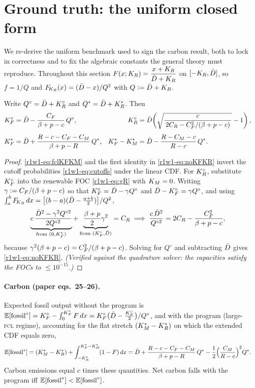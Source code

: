 \section{Ground truth: the uniform closed form}\label{r1w1-sec:uniform}

We re-derive the uniform benchmark used to sign the carbon result, both to lock
in correctness and to fix the algebraic constants the general theory must
reproduce. Throughout this section $F(x;K_R)=\dfrac{x+K_R}{\bar D+K_R}$ on
$[-K_R,\bar D]$, so $f=1/Q$ and $F_{\!K_R}(x)=(\bar D-x)/Q^2$ with $Q\vcentcolon=\bar D+K_R$.

\begin{lemma}\label{r1w1-lem:uniform}
Write $Q^{\circ}=\bar D+K_R^{\circ}$ and $Q^{*}=\bar D+K_R^{*}$. Then
\begin{align}
  K_F^{\circ}&=\bar D-\frac{C_F}{\beta+p-c}\,Q^{\circ},
  &K_R^{\circ}&=\bar D\!\left(\sqrt{\dfrac{c}{\,2C_R-C_F^{2}/(\beta+p-c)\,}}-1\right),
  \label{r1w1-eq:noKFKR}\\[4pt]
  K_F^{*}&=\bar D+\frac{R-c-C_F-C_M}{\beta+p-R}\,Q^{*},
  &K_F^{*}-K_M^{*}&=\bar D-\frac{R-C_M-c}{R-c}\,Q^{*}.
  \label{r1w1-eq:fclKFKM}
\end{align}
\end{lemma}

\begin{proof}
\eqref{r1w1-eq:fclKFKM} and the first identity in \eqref{r1w1-eq:noKFKR} invert the cutoff
probabilities \eqref{r1w1-eq:cutoffs} under the linear CDF. For $K_R^{\circ}$, substitute
$K_F^{\circ}$ into the renewable FOC \eqref{r1w1-eq:gR} with $K_M=0$. Writing
$\gamma\vcentcolon=C_F/(\beta+p-c)$ so that $K_F^{\circ}=\bar D-\gamma Q^{\circ}$ and
$\bar D-K_F^{\circ}=\gamma Q^{\circ}$, and using
$\int_a^bF_{\!K_R}\,dx=\big[(b-a)(\bar D-\tfrac{a+b}{2})\big]/Q^2$,
\[
  \underbrace{c\,\frac{\bar D^2-\gamma^2 Q^{\circ2}}{2Q^{\circ2}}}_{\text{from }(0,K_F^{\circ})}
  +\underbrace{\frac{\beta+p}{2}\gamma^2}_{\text{from }(K_F^{\circ},\bar D)}=C_R
  \;\Longrightarrow\;
  \frac{c\,\bar D^2}{Q^{\circ 2}}=2C_R-\frac{C_F^2}{\beta+p-c},
\]
because $\gamma^2(\beta+p-c)=C_F^2/(\beta+p-c)$. Solving for $Q^{\circ}$ and subtracting
$\bar D$ gives \eqref{r1w1-eq:noKFKR}. \emph{(Verified against the quadrature solver: the
capacities satisfy the FOCs to $\le10^{-15}$.)}
\end{proof}

\paragraph{Carbon (paper eqs.\ 25--26).}
Expected fossil output without the program is
$\mathbb{E}[\text{fossil}^{\circ}]=K_F^{\circ}-\int_0^{K_F^{\circ}}F\,dx
   =K_F^{\circ}\big(\bar D-\tfrac{K_F^{\circ}}{2}\big)/Q^{\circ}$,
and with the program (large-\textsc{fcl} regime), accounting for the flat stretch
$(K_M^{*}-K_R^{*})$ on which the extended CDF equals zero,
\begin{equation}\label{r1w1-eq:fosfcl}
  \mathbb{E}[\text{fossil}^{*}]
  =(K_M^{*}-K_R^{*})+\int_{-K_R^{*}}^{K_F^{*}-K_M^{*}}\!(1-F)\,dx
  =\bar D+\frac{R-c-C_F-C_M}{\beta+p-R}\,Q^{*}-\frac12\Big(\frac{C_M}{R-c}\Big)^{2}Q^{*}.
\end{equation}
Carbon emissions equal $c$ times these quantities. Net carbon falls with the
program iff $\mathbb{E}[\text{fossil}^{*}]<\mathbb{E}[\text{fossil}^{\circ}]$.

